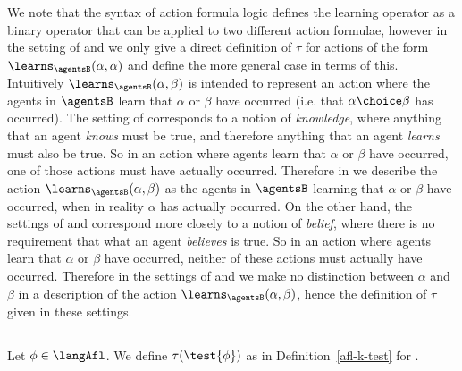 \documentclass[twoside]{aiml14}
\begin{document}
  We note that the syntax of action formula logic defines the learning operator
  as a binary operator that can be applied to two different action formulae,
  however in the setting of \classK{} and \classKFF{} we only give a direct
  definition of $\tau$ for actions of the form $\learns_\agentsB (\alpha, \alpha)$
  and define the more general case in terms of this. Intuitively 
  $\learns_\agentsB (\alpha, \beta)$ is intended to represent an action where
  the agents in $\agentsB$ learn that $\alpha$ or $\beta$ have occurred (i.e.
  that $\alpha \choice \beta$ has occurred). The setting of \classS{}
  corresponds to a notion of {\em knowledge}, where anything that an agent {\em
  knows} must be true, and therefore anything that an agent {\em learns} must
  also be true. So in an action where agents learn that $\alpha$ or $\beta$
  have occurred, one of those actions must have actually occurred. Therefore in
  \classS{} we describe the action $\learns_\agentsB (\alpha, \beta)$ as the
  agents in $\agentsB$ learning that $\alpha$ or $\beta$ have occurred, when in
  reality $\alpha$ has actually occurred. On the other hand, the settings of
  \classK{} and \classKFF{} correspond more closely to a notion of {\em
  belief}, where there is no requirement that what an agent {\em believes} is
  true. So in an action where agents learn that $\alpha$ or $\beta$ have
  occurred, neither of these actions must actually have occurred. Therefore in
  the settings of \classK{} and \classKFF{} we make no distinction between
  $\alpha$ and $\beta$ in a description of the action $\learns_\agentsB
  (\alpha, \beta)$, hence the definition of $\tau$ given in these settings.

  \subsection{\classKFF{}}

  \begin{definition}[Test]\label{afl-kff-test}
      Let $\phi \in \langAfl$. We define $\tau(\test{\phi})$ as in
      Definition~\ref{afl-k-test} for \classK{}.
  \end{definition}
\end{document}
